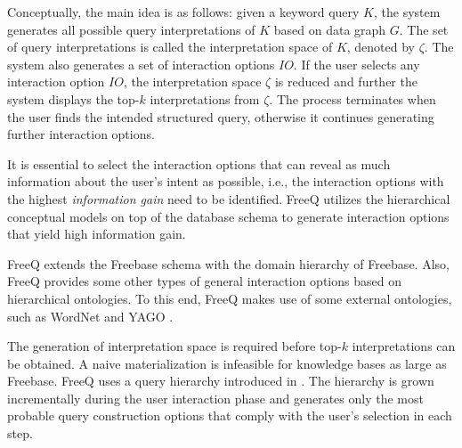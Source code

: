 \documentclass[a4paper, twoside, 12pt]{report}
\begin{document}
 Conceptually, the main idea is as follows: given a keyword query $K$, the system generates all possible query interpretations of $K$ based on data graph $G$. The set of query interpretations is called the interpretation space of $K$, denoted by $\zeta$. The system also generates a set of interaction options $IO$. If the user selects any interaction option $IO$, the interpretation space $\zeta$ is reduced and further the system displays the top-$k$ interpretations from $\zeta$. The process terminates when the user finds the intended structured query, otherwise it continues generating further interaction options.

 It is essential to select the interaction options that can reveal as much information about the user’s intent as possible, i.e., the interaction options with the highest \emph{information gain} need to be identified. FreeQ utilizes the hierarchical conceptual models on top of the database schema to generate interaction options that yield high information gain.

 FreeQ extends the Freebase schema with the domain hierarchy of Freebase. Also, FreeQ provides some other types of general interaction options based on hierarchical ontologies. To this end, FreeQ makes use of some external ontologies, such as WordNet \cite{miller1995wordnet} and YAGO \cite{suchanek2007yago}.

 The generation of interpretation space is required before top-$k$ interpretations can be obtained. A naive materialization is infeasible for knowledge bases as large as Freebase. FreeQ  uses a query hierarchy introduced in \cite{demidova2012probabilistic}. The hierarchy is grown incrementally during the user interaction phase and generates only the most probable query construction options that comply with the user's selection in each step.
\end{document}
